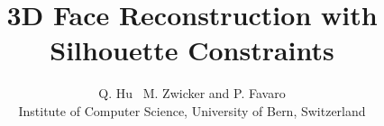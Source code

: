 
  
\usepackage{amsmath}
\usepackage{amsfonts}

\title[3D Face Reconstruction with Silhouette Constraints]%
      {3D Face Reconstruction with Silhouette Constraints}

\author[Q. Hu \& M. Zwicker \& P. Favaro]
       {Q. Hu \, M. Zwicker
        and P. Favaro
        \\
         Institute of Computer Science, University of Bern, Switzerland\\
       }
        

%
\usepackage{graphicx,booktabs,multirow}






